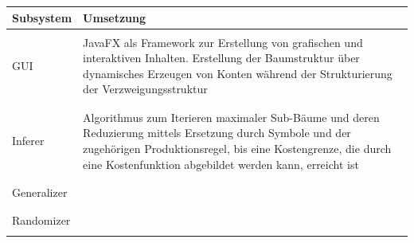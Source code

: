 \documentclass[11pt]{article}
\begin{document}
    \begin{center}
        \begin{tabular}{l|l}
            \textbf{Subsystem} & \textbf{Umsetzung} \\
            \hline \\
            GUI &
            \begin{minipage}[t]{0.8\textwidth}
               JavaFX als Framework zur Erstellung von grafischen und interaktiven Inhalten.
                Erstellung der Baumstruktur über dynamisches Erzeugen von Konten während der Strukturierung der
               Verzweigungsstruktur
            \end{minipage} \\
            \\ \hline \\
            Inferer &
            \begin{minipage}[t]{0.8\textwidth}
                Algorithmus zum Iterieren maximaler Sub-Bäume und deren Reduzierung mittels Ersetzung durch Symbole
                und der zugehörigen Produktionsregel, bis eine Kostengrenze, die durch eine Kostenfunktion abgebildet
                werden kann, erreicht ist
            \end{minipage} \\
            \\ \hline \\
            Generalizer &
            \begin{minipage}[t]{0.8\textwidth}

            \end{minipage} \\
            \\ \hline \\
            Randomizer &
            \begin{minipage}[t]{0.8\textwidth}

            \end{minipage} \\
            \\ \hline
        \end{tabular}
    \end{center}
\end{document}
